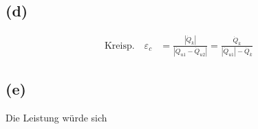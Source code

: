 \subsection*{(d)}

\begin{align*}
    \text{Kreisp.} \quad \varepsilon_c &= \frac{|\dot{Q}_k|}{|\dot{Q}_{u1} - \dot{Q}_{u2}|} = \frac{\dot{Q}_k}{|\dot{Q}_{u1}| - \dot{Q}_k}
\end{align*}

\subsection*{(e)}

Die Leistung würde sich \\
\quad \quad \quad \quad \quad \quad \quad \quad \quad \quad \quad \quad \quad \quad \quad \quad \quad \quad \quad \quad \quad \quad \quad \quad \quad \quad \quad \quad \quad \quad \quad \quad \quad \quad \quad \quad \quad \quad \quad \quad \quad \quad \quad \quad \quad \quad \quad \quad \quad \quad \quad \quad \quad \quad \quad \quad \quad \quad \quad \quad \quad \quad \quad \quad \quad \quad \quad \quad \quad \quad \quad \quad \quad \quad \quad \quad \quad \quad \quad \quad \quad \quad \quad \quad \quad \quad \quad \quad \quad \quad \quad \quad \quad \quad \quad \quad \quad \quad \quad \quad \quad \quad \quad \quad \quad \quad \quad \quad \quad \quad \quad \quad \quad \quad \quad \quad \quad \quad \quad \quad \quad \quad \quad \quad \quad \quad \quad \quad \quad \quad \quad \quad \quad \quad \quad \quad \quad \quad \quad \quad \quad \quad \quad \quad \quad \quad \quad \quad \quad \quad \quad \quad \quad \quad \quad \quad \quad \quad \quad \quad \quad \quad \quad \quad \quad \quad \quad \quad \quad \quad \quad \quad \quad \quad \quad \quad \quad \quad \quad \quad \quad \quad \quad \quad \quad \quad \quad \quad \quad \quad \quad \quad \quad \quad \quad \quad \quad \quad \quad \quad \quad \quad \quad